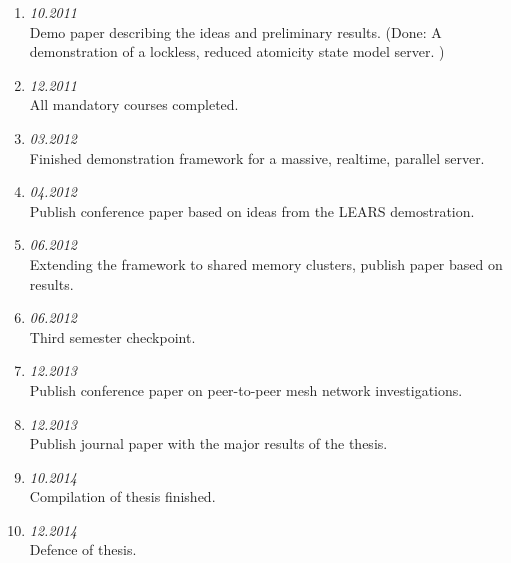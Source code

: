 \documentclass{article}
\begin{document}
\begin{enumerate}

   \item{}\textit{10.2011}\\
   Demo paper describing the ideas and preliminary
   results. (Done: A demonstration of a lockless, reduced atomicity state model server. )
   \item{}\textit{12.2011}\\
   All mandatory courses completed.
   \item{}\textit{03.2012}\\
   Finished demonstration framework for a massive, realtime, parallel server.
   \item{}\textit{04.2012}\\
   Publish conference paper based on ideas from the LEARS demostration.
   \item{}\textit{06.2012}\\
   Extending the framework to shared memory clusters, publish paper based on results.
   \item{}\textit{06.2012}\\
   Third semester checkpoint.
   \item{}\textit{12.2013}\\
   Publish conference paper on peer-to-peer mesh network investigations.
   \item{}\textit{12.2013}\\
   Publish journal paper with the major results of the thesis.
   \item{}\textit{10.2014}\\
   Compilation of thesis finished.
   \item{}\textit{12.2014}\\
   Defence of thesis.

\end{enumerate}



\end{document}
